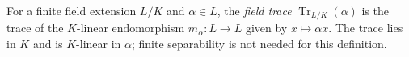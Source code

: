 
For a finite field extension $L/K$ and $\alpha\in L$, the \emph{field trace} $\operatorname{Tr}_{L/K}(\alpha)$ is the trace of the $K$-linear endomorphism $m_\alpha:L\to L$ given by $x\mapsto\alpha x$. The trace lies in $K$ and is $K$-linear in $\alpha$; finite separability is not needed for this definition.
